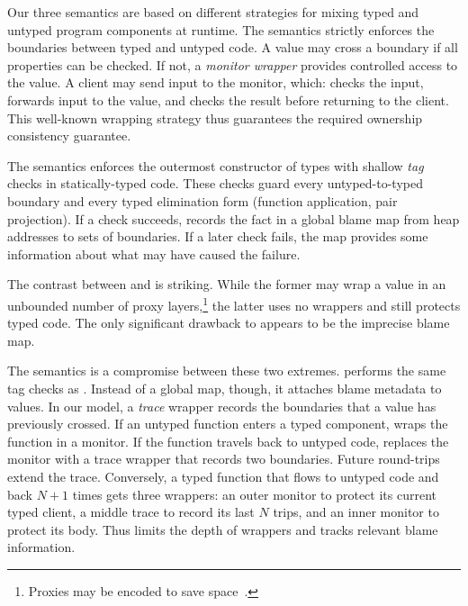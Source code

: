 Our three semantics are based on different strategies for mixing typed and
 untyped program components at runtime.
The \Nname{} semantics strictly enforces the boundaries between typed and
 untyped code. A value may cross a boundary if all properties can be checked.
If not, a \emph{monitor wrapper}\/ provides controlled access to the value.
A client may send input to the monitor, which: checks the input,
 forwards input to the value, and checks the result before returning to the client.
This well-known
 wrapping strategy thus guarantees the required ownership consistency guarantee. 

The \Tname{} semantics enforces the outermost constructor of types with
 shallow \emph{tag}\/ checks in statically-typed code.  These checks guard every
 untyped-to-typed boundary and every typed elimination form (function
 application, pair projection).  If a check succeeds, \Tname{} records the
 fact in a global blame map from heap addresses to sets of boundaries.  If a
 later check fails, the map provides some information about what may have
 caused the failure.

The contrast between \Nname{} and \Tname{} is striking. While the former may
wrap a value in an unbounded number of proxy layers,\footnote{Proxies may be
 encoded to save space~\cite{stw-pldi-2015,htf-hosc-2010,g-popl-2015}.}
the latter uses no
wrappers and still protects typed code. The only significant drawback to
\Tname{} appears to be the imprecise blame map.

The \Aname{} semantics is a compromise between these two extremes.  \Aname{}
performs the same tag checks as \Tname{}. Instead of a global map, though, it
attaches blame metadata to values. In our model, a \emph{trace} wrapper records
the boundaries that a value has previously crossed.
If an untyped function enters a typed component, \Aname{} wraps the
function in a monitor.  If the function travels back to untyped code, \Aname{} replaces the
monitor with a trace wrapper that records two boundaries.
Future round-trips extend the trace.
Conversely, a typed function that flows to untyped code and back $N{+}1$ times gets
three wrappers: an outer monitor to protect its
current typed client, a middle trace to record its last $N$ trips, and an
inner monitor to protect its body.
Thus \Aname{} limits the depth of wrappers and tracks relevant blame information.

